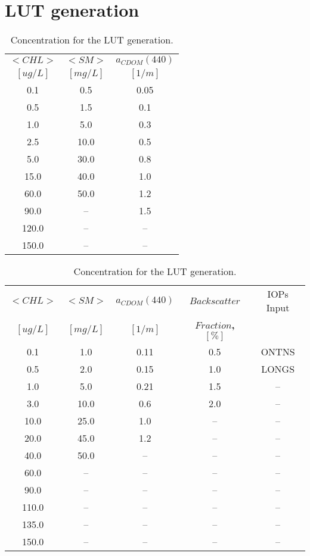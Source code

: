 \section{LUT generation}
\begin{table}[!ht]
\caption{ Concentration for the LUT generation. \label{tab:LUTconc} } 
\centering
		\begin{tabular}{c|c|c}
        		\bfseries{$<CHL>$}  	& \bfseries{$<SM>$}  & \bfseries{$a_{CDOM}(440)$} \\
		$[ug/L]$  		& $[mg/L]$ & 	$[1/m]$		\\ \hline \hline
			0.1		& 0.5 	& 0.05	\\
			0.5		& 1.5	  &	0.1		\\
			1.0		& 5.0	  &	0.3		\\
			2.5		& 10.0	&	0.5		\\
			5.0		& 30.0	&	0.8		\\
			15.0	& 40.0	&	1.0		\\
			60.0	& 50.0	&	1.2		\\
			90.0	& --	  &	1.5		\\
			120.0	& --	  &	--		\\
			150.0	& --	  &	-- 		\\    
	 	\end{tabular}
	\end{table}


 

\begin{table}[!ht]
\caption{ Concentration for the LUT generation. \label{tab:LUTconc2} } 
\centering
		\begin{tabular}{c|c|c|c|c}
        		\bfseries{$<CHL>$}  	& \bfseries{$<SM>$}  & \bfseries{$a_{CDOM}(440)$} & \bfseries{$Backscatter$} & IOPs Input\\
		$[ug/L]$  		& $[mg/L]$ & 	$[1/m]$ &	\bfseries{$Fraction$}, $[\%]$	\\ \hline \hline
0.1   & 1.0  &  0.11 &  0.5 & ONTNS\\
0.5   & 2.0  &  0.15 &  1.0 & LONGS\\
1.0   & 5.0  &  0.21 &  1.5 & --\\
3.0   & 10.0 &  0.6  &  2.0 & --\\
10.0  & 25.0 &  1.0  &  --  & --\\
20.0  & 45.0 &  1.2  &  --  & --\\
40.0  & 50.0 &  --   &  --  & --\\
60.0  & --   &  --   &  --  & --\\  
90.0  & --   &  --   &  --  & --\\  
110.0 & --   &  --   &  --  & --\\  
135.0 & --   &  --   &  --  & --\\  
150.0 & --   &  --   &  --  & --\\     
	 	\end{tabular}
	\end{table}

